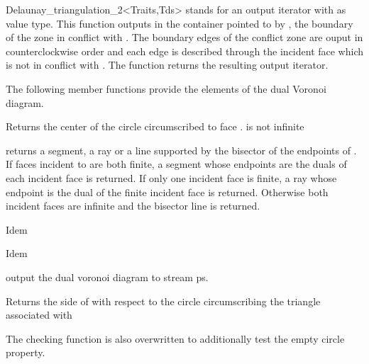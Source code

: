 \begin{ccRefClass}{Delaunay_triangulation_2<Traits,Tds>}
{  stands for an output iterator with 
 as value
type.
 This function  outputs in the container pointed to by ,
the boundary of the zone in conflict with . The boundary edges
of the conflict  zone are ouput in counterclockwise order
and each edge is described  through the incident face
which is not in conflict with .
The function returns the resulting output iterator.}


The following member functions provide the elements of the
dual Voronoi diagram.

{Returns the center of the circle circumscribed to face .
\ccPrecond {} is not infinite}

{returns a segment, a ray or a line supported by the bisector of the
endpoints of .
If faces incident to  are both finite, a segment whose endpoints are the
duals of each incident face is returned. If only one incident face is
finite, a
ray whose endpoint is the dual of the finite incident face is returned.
Otherwise both incident faces
are infinite and the bisector line is returned.}

{Idem}

{Idem}

{output the dual voronoi diagram to stream ps.}


\ccPredicates
{}
\ccThreeToTwo

{Returns the side of  with respect to the circle circumscribing
 the triangle associated with }

\begin{ccAdvanced}

The checking function  is also overwritten
to additionally test the empty circle property.


\end{ccAdvanced}
\end{ccRefClass}
